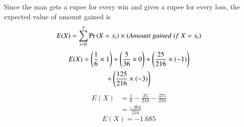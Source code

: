 \documentclass[journal,12pt,twocolumn]{IEEEtran}
\begin{document}
Since the man gets a rupee for every win and gives a rupee for every loss, the expected value of amount gained is
\begin{align}
    E(X) = \sum_{i=0}^{3} \pr{X=x_i} \times (Amount \ gained \ if \ X=x_i)
\end{align}
\begin{multline}
    E(X) = \left(\frac{1}{6} \times 1\right)   + \left( \frac{5}{36} \times 0 \right) + \left(\frac{25}{216} \times (-1) \right) \\
    + \left(\frac{125}{216} \times (-3) \right) 
\end{multline}
\begin{align}
    E(X) &= \frac{1}{6} - \frac{25}{216} - \frac{375}{216} \\
    &= \frac{-364}{216} 
\end{align}
\begin{equation}
    \boxed{E(X) = -1.685}
\end{equation}
  
\end{document}
